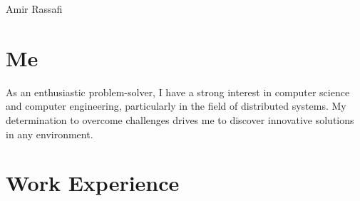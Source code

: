 \documentclass[
	10pt, %
]{FreemanCV}
\begin{document}
\begin{paracol}{2} %


\parbox[][0.11\textheight][c]{\linewidth}{ %
	\centering %

\medskip %
\medskip %
\medskip %

{\sffamily\Huge Amir Rassafi} %


\vfill %
}


\section{Me}

As an enthusiastic problem-solver, I have a strong interest in computer science and computer engineering, particularly in the field of distributed systems. My determination to overcome challenges drives me to discover innovative solutions in any environment. 

\medskip %


\section{Work Experience}





\end{paracol}
\end{document}

